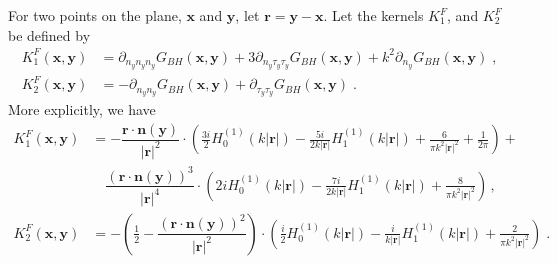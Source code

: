 \documentclass[preprint,12pt]{article}
\def\br{{\boldsymbol r}}
\def\bn{{\boldsymbol n}}
\def\xx{{\boldsymbol x}}
\def\yy{{\boldsymbol y}}
\def\Gbh{{G_{BH}}}
\begin{document}
For two points on the plane, $\xx$ and $\yy$, let $\br = \yy - \xx$. Let the kernels $K_{1}^{F}$, and 
$K_{2}^{F}$ be defined by 
\begin{align}
  K_1^F(\xx,\yy) &= \partial_{n_{y}n_{y}n_{y}}\Gbh(\xx,\yy)
  + 3 \partial_{n_{y}\tau_{y}\tau_{y}}\Gbh(\xx,\yy) + k^{2} \partial_{n_{y}}\Gbh(\xx,\yy)\; , \label{eq:kf1} \\
  K_2^F(\xx,\yy) &= -\partial_{n_{y}n_{y}}\Gbh(\xx,\yy)
  + \partial_{\tau_{y}\tau_{y}}\Gbh(\xx,\yy) \label{eq:kf2} \; .
\end{align}
More explicitly, we have
\begin{align}
  K_1^F(\xx,\yy) &=  -\dfrac{\br \cdot \bn(\yy)}{|\br|^2}  \cdot \left( \frac{3 i}{2} H_0^{(1)}(k|\br|) - \frac{5 i}{2 k|\br|} H_1^{(1)}(k|\br|) + \frac{6}{\pi k^2 |\br|^2} + \frac{1}{2\pi}  \right) +     \\
  & \quad \dfrac{\left(\br \cdot \bn(\yy)\right)^3}{|\br|^4} \cdot \left( 2i H_0^{(1)}(k|\br|) - \frac{7 i}{2 k|\br|} H_1^{(1)}(k|\br|) + \frac{8}{\pi k^2 |\br|^2}  \right) \, , \nonumber \\
  K_2^F(\xx,\yy) &=  -\left(\frac{1}{2}-\dfrac{\left(\br \cdot \bn(\yy)\right)^2}{|\br|^2} \right)  \cdot \left( \frac{i}{2} H_0^{(1)}(k|\br|) - \frac{i}{k|\br|} H_1^{(1)}(k|\br|) + \frac{2}{\pi k^2 |\br|^2}  \right)\; .
\end{align}
\end{document}

